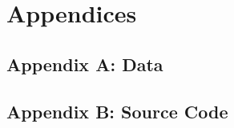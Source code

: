 \documentclass[a4paper]{article}
\begin{document}
\section{Appendices}

\subsection{Appendix A: Data}

\begin{table}[H]

\end{table}

\subsection{Appendix B: Source Code}

\inputminted{julia}{BiotSavartTheoretical.jl}

\inputminted{julia}{BiotSavartExperimental.jl}

\inputminted{julia}{TheoreticalVsExperimental.jl}
\end{document}
